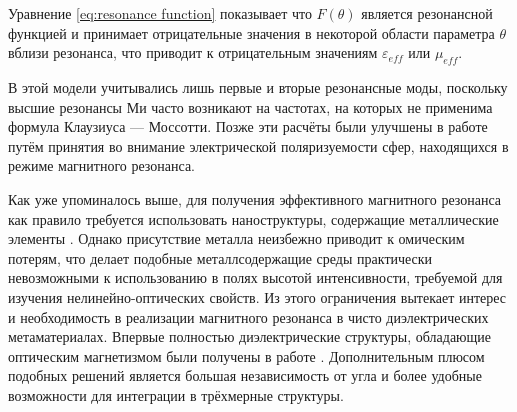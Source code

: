 Уравнение \ref{eq:resonance function} показывает что $F(\theta)$ является резонансной функцией и принимает отрицательные значения в некоторой области параметра $\theta$ вблизи резонанса, что приводит к отрицательным значениям $\varepsilon_{eff}$ или $\mu_{eff}$.

В этой модели учитывались лишь первые и вторые резонансные моды, поскольку высшие резонансы Ми часто возникают на частотах, на которых не применима формула Клаузиуса — Моссотти. Позже эти расчёты были улучшены в работе \cite{Jylha2006} путём принятия во внимание электрической поляризуемости сфер, находящихся в режиме магнитного резонанса.

Как уже упоминалось выше, для получения эффективного магнитного резонанса как правило требуется использовать наноструктуры, содержащие металлические элементы \cite{Zhao2009}. Однако присутствие металла неизбежно приводит к омическим потерям, что делает подобные металлсодержащие среды практически невозможными к использованию в полях высотой интенсивности, требуемой для изучения нелинейно-оптических свойств. Из этого ограничения вытекает интерес и необходимость в реализации магнитного резонанса в чисто диэлектрических метаматериалах. Впервые полностью диэлектрические структуры, обладающие оптическим магнетизмом были получены в работе \cite{Ginn2012}. Дополнительным плюсом подобных решений является большая независимость от угла и более удобные возможности для интеграции в трёхмерные структуры.